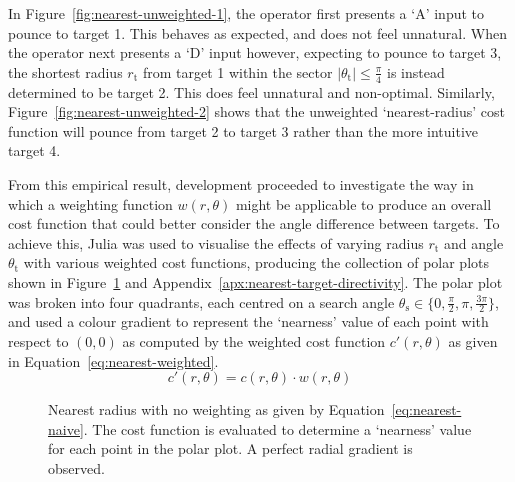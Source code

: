 \documentclass[12pt,british,UKenglish]{article}
\begin{document}
In Figure~\ref{fig:nearest-unweighted-1}, the operator first presents a `A' input to pounce to target 1.
This behaves as expected, and does not feel unnatural.
When the operator next presents a `D' input however, expecting to pounce to target 3, the shortest radius $r_\text{t}$ from target 1 within the sector $\left\lvert\theta_\text{t}\right\rvert \leq \frac{\pi}{4}$ is instead determined to be target 2.
This does feel unnatural and non-optimal.
Similarly, Figure~\ref{fig:nearest-unweighted-2} shows that the unweighted `nearest-radius' cost function will pounce from target 2 to target 3 rather than the more intuitive target 4.

From this empirical result, development proceeded to investigate the way in which a weighting function $w(r, \theta)$ might be applicable to produce an overall cost function that could better consider the angle difference between targets.
To achieve this, Julia was used to visualise the effects of varying radius $r_\text{t}$ and angle $\theta_\text{t}$ with various weighted cost functions, producing the collection of polar plots shown in Figure~\ref{fig:nearest-unweighted-vis} and Appendix~\ref{apx:nearest-target-directivity}.
The polar plot was broken into four quadrants, each centred on a search angle $\theta_\text{s} \in \{0, \frac{\pi}{2}, \pi, \frac{3\pi}{2}\}$, and used a colour gradient to represent the `nearness' value of each point with respect to $(0, 0)$ as computed by the weighted cost function $c'(r, \theta)$ as given in Equation~\eqref{eq:nearest-weighted}.
\begin{equation}
    c'(r, \theta) = c(r, \theta) \cdot w(r, \theta)
    \label{eq:nearest-weighted}
\end{equation}

\begin{figure}[hbtp]
    \quad
    \centering
    \caption{Nearest radius with no weighting as given by Equation~\eqref{eq:nearest-naive}. The cost function is evaluated to determine a `nearness' value for each point in the polar plot. A perfect radial gradient is observed.}
    \label{fig:nearest-unweighted-vis}
\end{figure}
\end{document}
